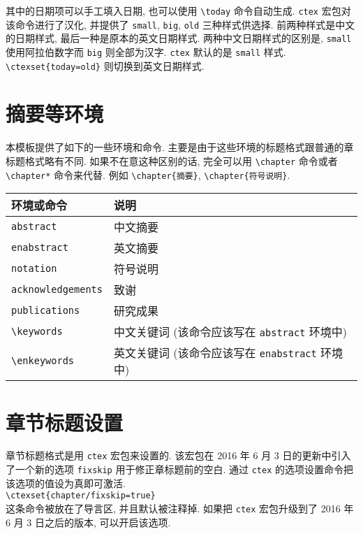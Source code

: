 其中的日期项可以手工填入日期, 也可以使用 \verb|\today| 命令自动生成. \verb|ctex| 宏包对该命令进行了汉化, 并提供了 \verb|small|, \verb|big|, \verb|old| 三种样式供选择. 前两种样式是中文的日期样式, 最后一种是原本的英文日期样式. 两种中文日期样式的区别是, \verb|small| 使用阿拉伯数字而 \verb|big| 则全部为汉字. \verb|ctex| 默认的是 \verb|small| 样式. \verb|\ctexset{today=old}| 则切换到英文日期样式.

\section{摘要等环境}

本模板提供了如下的一些环境和命令. 主要是由于这些环境的标题格式跟普通的章标题格式略有不同. 如果不在意这种区别的话, 完全可以用 \verb|\chapter| 命令或者 \verb|\chapter*| 命令来代替. 例如 \verb|\chapter{摘要}|, \verb|\chapter{符号说明}|.

\begin{center}
  \begin{tabular}{ll}
    \toprule
    环境或命令              & 说明\\
    \midrule
    \verb|abstract|         & 中文摘要\\
    \verb|enabstract|       & 英文摘要\\
    \verb|notation|         & 符号说明\\
    \verb|acknowledgements| & 致谢\\
    \verb|publications|     & 研究成果\\
    \midrule
    \verb|\keywords|        & 中文关键词 (该命令应该写在 \verb|abstract| 环境中)\\
    \verb|\enkeywords|      & 英文关键词 (该命令应该写在 \verb|enabstract| 环境中)\\
    \bottomrule
  \end{tabular}
\end{center}

\section{章节标题设置}

章节标题格式是用 \verb|ctex| 宏包来设置的. 该宏包在 2016 年 6 月 3 日的更新中引入了一个新的选项 \verb|fixskip| 用于修正章标题前的空白. 通过 \verb|ctex| 的选项设置命令把该选项的值设为真即可激活.\\
\verb|\ctexset{chapter/fixskip=true}|\\
这条命令被放在了导言区, 并且默认被注释掉. 如果把 \verb|ctex| 宏包升级到了 2016 年 6 月 3 日之后的版本, 可以开启该选项.
